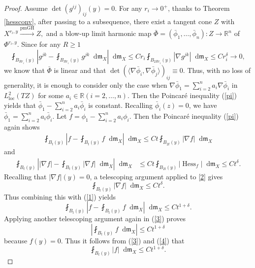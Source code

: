 \documentclass[11pt,reqno]{amsart}
\theoremstyle{definition}
\numberwithin{equation}{section}
\newcommand{\di}{\mathop{}\!\mathrm{d}}
\newcommand{\meas}{\mathfrak{m}}
\DeclareMathOperator{\Hess}{Hess}
\DeclareMathOperator{\loc}{loc}
\begin{document}
\begin{proof}
Assume $\det(g^{ij})_{ij}(y)=0$.
For any $r_i \to 0^+$, thanks to Theorem \ref{hessconv}, after passing to a subsequence, there exist a tangent cone $Z$ with 
    $
        X^{r_i, y} \stackrel{\mathrm{pmGH}}{\to}Z,
 $
and a blow-up limit harmonic map 
    $
\bar \Phi= (\bar \phi_1, \ldots, \bar \phi_n):Z \to \mathbb{R}^n
$
of $\Phi^{r_i, y}$.
Since for any $R \ge 1$
\begin{equation*}
    \fint_{B_{Rr_i}(y)}\left|g^{jk}-\fint_{B_{Rr_i}(y)}g^{jk}\di \meas_X\right|\di \meas_X \le Cr_i\fint_{B_{2Rr_i}(y)}|\nabla g^{jk}|\di \meas_X \le Cr_i^{\delta} \to 0, 
\end{equation*}
we know that $\bar \Phi$ is linear and that  
$\det(\langle \nabla \bar \phi_i, \nabla \bar \phi_j\rangle )_{ij} \equiv 0$. Thus, with no loss of generality, it is enough to consider only the case when
$
\nabla \bar \phi_1=\sum_{i=2}^na_i\nabla \bar \phi_i$ in $L^2_{\loc}(TZ)$ for some $a_i \in \mathbb{R} (i=2,\ldots, n)$.
Then the Poincar\'e inequality (\ref{pi}) yields that $ \bar \phi_1-\sum_{i=2}^na_i\bar \phi_i$ is constant. Recalling $\bar \phi_i(z)=0$, we have
$
\bar \phi_1=\sum_{i=2}^na_i\bar \phi_i.
$
Let $f=\phi_1-\sum_{i=2}^na_i\phi_i$. Then the Poincar\'e inequality (\ref{pi}) again shows
\begin{align}\label{1}
\fint_{B_t(y)}\left| f- \fint_{B_t(y)}f\di \meas_X \right|\di \meas_X \le Ct\fint_{B_{2t}(y)}|\nabla f |\di \meas_X
\end{align}
and 
\begin{align}\label{2}
\fint_{B_t(y)}\left| |\nabla f| - \fint_{B_t(y)}|\nabla f|\di \meas_X\right|\di \meas_X &\le Ct\fint_{B_{2t}(y)}| \Hess_f|\di \meas_X \le Ct^{\delta}.
\end{align}
Recalling that $|\nabla f|(y)=0$, a telescoping argument applied to \eqref{2} gives 
\begin{equation}
\fint_{B_t(y)}|\nabla f|\di \meas_X \le Ct^{\delta}.
\end{equation}
Thus combining this with (\ref{1}) yields
\begin{equation}\label{3}
\fint_{B_t(y)}\left| f- \fint_{B_t(y)}f\di \meas_X \right|\di \meas_X \le Ct^{1+\delta}.
\end{equation}
Applying another telescoping argument again in (\ref{3}) proves
\begin{equation}\label{4}
\left| \fint_{B_t(y)}f\di \meas_X\right|\le Ct^{1+\delta}
\end{equation}
because $f(y)=0$. Thus it follows from (\ref{3}) and (\ref{4}) that
\begin{equation}\label{5}
\fint_{B_t(y)}\left| f\right|\di \meas_X\le Ct^{1+\delta}.
\end{equation}


\end{proof}
\end{document}
